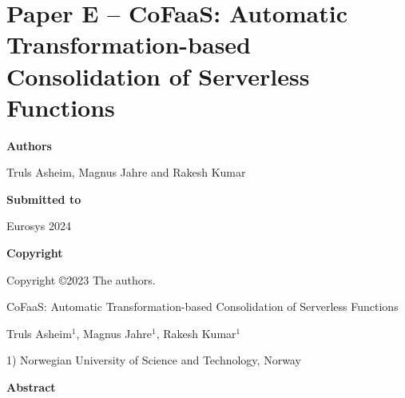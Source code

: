 \documentclass[../../../main.tex]{subfiles}
\begin{document}
\chapter[Paper E -- CoFaaS: Automatic Consolidation of Serverless Functions]{Paper E -- CoFaaS: Automatic Transformation-based Consolidation of Serverless Functions }

\label{chap:eurosys-paper}

\noindent \textbf{Authors}

\vspace*{0.3cm}

\noindent Truls Asheim, Magnus Jahre and Rakesh Kumar

\vspace*{0.7cm}

\noindent \textbf{Submitted to}

\vspace*{0.3cm}

\noindent Eurosys 2024

\vspace*{0.7cm}

\noindent \textbf{Copyright}

\vspace*{0.3cm}

\noindent Copyright ©2023 The authors.

\newpage

\vspace*{0.1cm}

\begin{center}

\Huge{CoFaaS: Automatic Transformation-based Consolidation of Serverless Functions}

\vspace{0.6cm}

\large{Truls Asheim$^{1}$, Magnus Jahre$^{1}$, Rakesh Kumar$^{1}$}

\vspace{0.1cm}

\small{1) Norwegian University of Science and Technology, Norway}


\end{center}

\vspace{0.2cm}

\begin{center}
  \textbf{Abstract}
  \end{center}
\begin{changemargin}{0.75cm}{0.75cm}

\end{changemargin}

\vspace{1cm}

\begin{refsection}[cofaas]
  
  \printbibliography[heading=refs]

\end{refsection}
\FloatBarrier
\end{document}
